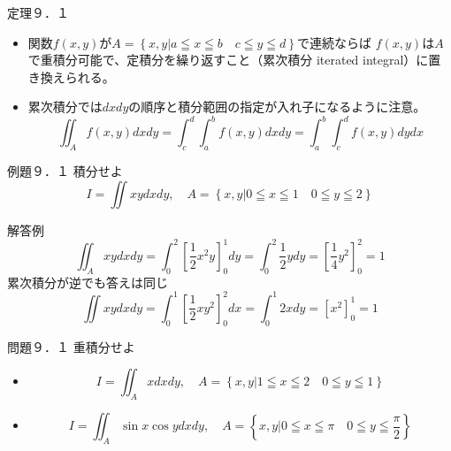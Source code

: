 \begin{slide}{定理９．１}
\begin{itemize}
\item 関数$f(x,y)$が$A=\left\{x,y | a \leqq x \leqq b \quad c \leqq y \leqq d\right\}$で連続ならば
$f(x,y)$は$A$で重積分可能で、定積分を繰り返すこと（累次積分 iterated integral）に置き換えられる。
\item 累次積分では$dx dy$の順序と積分範囲の指定が入れ子になるように注意。
\begin{equation}
\iint_A f(x,y) dx dy = \int_c^d \int_a^b f(x,y) dx dy = \int_a^b\int_c^d f(x,y) dy dx \nonumber
\end{equation}
\end{itemize}
\end{slide}
\begin{frame}[fragile]{例題９．１}
積分せよ
\begin{equation}
I = \iint xy dxdy, \quad A=\left\{x,y | 0\leqq x \leqq 1 \quad 0\leqq y \leqq 2\right\} \nonumber
\end{equation}

解答例
\begin{equation}
\iint_A xy dxdy = \int_0^2 \left[\frac{1}{2}x^2y\right]_0^1 dy = \int_0^2 \frac{1}{2}y dy = \left[\frac{1}{4}y^2\right]_0^2 = 1 \nonumber
\end{equation}
累次積分が逆でも答えは同じ
\begin{equation}
\iint xy dxdy = \int_0^1 \left[\frac{1}{2}xy^2\right]_0^2 dx = \int_0^1 2x dy = \left[x^2\right]_0^1 = 1 \nonumber
\end{equation}
\end{frame}
\begin{slide}{問題９．１}
重積分せよ
\begin{itemize}
\item 
\begin{equation}
I = \iint_A x dxdy, \quad A=\left\{x,y | 1\leqq x \leqq 2 \quad 0\leqq y \leqq 1\right\} \nonumber
\end{equation}
\item 
\begin{equation}
I = \iint_A \sin{x}\cos{y} dxdy, \quad A=\left\{x,y | 0\leqq x \leqq \pi  \quad 0\leqq y \leqq \frac{\pi}{2} \right\} \nonumber
\end{equation}

\end{itemize}
\end{slide}
